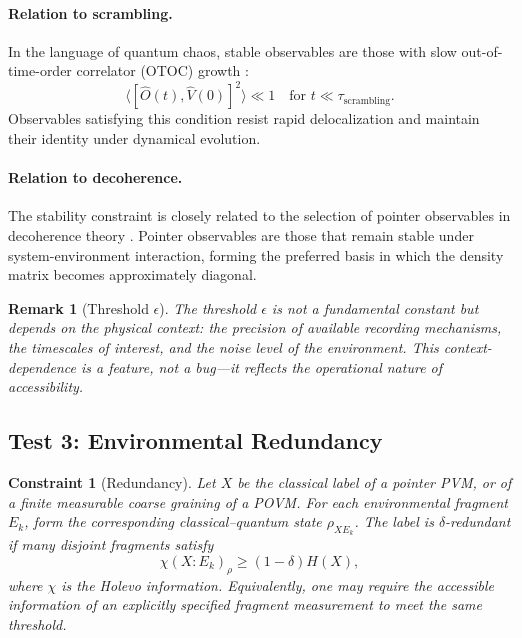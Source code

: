 \documentclass[12pt,a4paper,openany]{book}
\newtheorem{remark}[theorem]{Remark}
\newtheorem{constraint}[theorem]{Constraint}
\begin{document}
\paragraph{Relation to scrambling.}
In the language of quantum chaos, stable observables are those with slow out-of-time-order correlator (OTOC) growth \cite{Hayden2007}:
\begin{equation}
\langle [\hat{O}(t), \hat{V}(0)]^2 \rangle \ll 1 \quad \text{for } t \ll \tau_{\text{scrambling}}.
\end{equation}
Observables satisfying this condition resist rapid delocalization and maintain their identity under dynamical evolution.

\paragraph{Relation to decoherence.}
The stability constraint is closely related to the selection of pointer observables in decoherence theory \cite{Zurek2003}. Pointer observables are those that remain stable under system-environment interaction, forming the preferred basis in which the density matrix becomes approximately diagonal.

\begin{remark}[Threshold $\epsilon$]
The threshold $\epsilon$ is not a fundamental constant but depends on the physical context: the precision of available recording mechanisms, the timescales of interest, and the noise level of the environment. This context-dependence is a feature, not a bug---it reflects the operational nature of accessibility.
\end{remark}

\subsection{Test 3: Environmental Redundancy}

\begin{constraint}[Redundancy]
\label{H-E-const:redundancy}
Let $X$ be the classical label of a pointer PVM, or of a finite measurable coarse graining of a POVM.  For each environmental fragment $E_k$, form the corresponding classical--quantum state $\rho_{XE_k}$.  The label is $\delta$-redundant if many disjoint fragments satisfy
\begin{equation}
\chi(X:E_k)_{\rho}\ge(1-\delta)H(X),
\end{equation}
where $\chi$ is the Holevo information.  Equivalently, one may require the accessible information of an explicitly specified fragment measurement to meet the same threshold.
\end{constraint}
\end{document}
